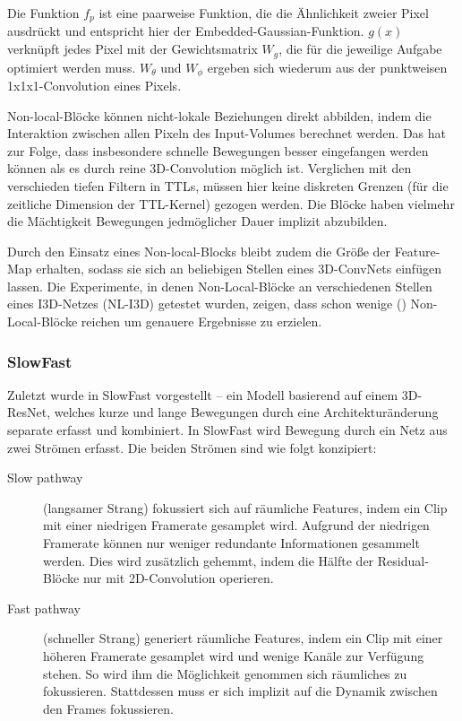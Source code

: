 Die Funktion $f_p$ ist eine paarweise Funktion, die die Ähnlichkeit zweier Pixel ausdrückt und entspricht hier der Embedded-Gaussian-Funktion.
$g(x)$ verknüpft jedes Pixel mit der Gewichtsmatrix $W_g$, die für die jeweilige Aufgabe optimiert werden muss.
$W_\theta$ und $W_\phi$ ergeben sich wiederum aus der punktweisen 1x1x1-Convolution eines Pixels.

Non-local-Blöcke können nicht-lokale Beziehungen direkt abbilden, indem die Interaktion zwischen allen Pixeln des Input-Volumes berechnet werden.
Das hat zur Folge, dass insbesondere schnelle Bewegungen besser eingefangen werden können als es durch reine 3D-Convolution möglich ist.
Verglichen mit den verschieden tiefen Filtern in TTLs, müssen hier keine diskreten Grenzen (für die zeitliche Dimension der TTL-Kernel) gezogen werden.
Die Blöcke haben vielmehr die Mächtigkeit Bewegungen jedmöglicher Dauer implizit abzubilden.

Durch den Einsatz eines Non-local-Blocks bleibt zudem die Größe der Feature-Map erhalten, sodass sie sich an beliebigen Stellen eines 3D-ConvNets einfügen lassen.
Die Experimente, in denen Non-Local-Blöcke an verschiedenen Stellen eines I3D-Netzes (NL-I3D) getestet wurden, zeigen, dass schon wenige () Non-Local-Blöcke reichen um genauere Ergebnisse zu erzielen.

\subsubsection*{SlowFast}

Zuletzt wurde in \cite{Feichtenhofer18} SlowFast vorgestellt -- ein Modell basierend auf einem 3D-ResNet, welches kurze und lange Bewegungen durch eine Architekturänderung separate erfasst und kombiniert.
In SlowFast wird Bewegung durch ein Netz aus zwei Strömen erfasst.
Die beiden Strömen sind wie folgt konzipiert:

\begin{description}
    \item[Slow pathway] (langsamer Strang) fokussiert sich auf räumliche Features, indem ein Clip mit einer niedrigen Framerate gesamplet wird.
    Aufgrund der niedrigen Framerate können nur weniger redundante Informationen gesammelt werden.
    Dies wird zusätzlich gehemmt, indem die Hälfte der Residual-Blöcke nur mit 2D-Convolution operieren.
    \item[Fast pathway] (schneller Strang) generiert räumliche Features, indem ein Clip mit einer höheren Framerate gesamplet wird und wenige Kanäle zur Verfügung stehen.
    So wird ihm die Möglichkeit genommen sich räumliches zu fokussieren.
    Stattdessen muss er sich implizit auf die Dynamik zwischen den Frames fokussieren.
\end{description}

